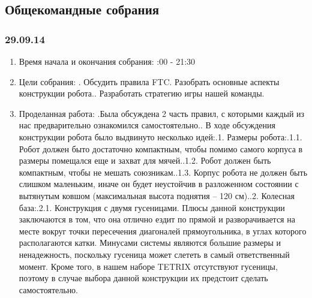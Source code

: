 \documentclass[12pt]{article}
\begin{document}
	      \subsection{Общекомандные собрания}
	      \subsubsection{29.09.14}
	      \begin{enumerate}
	      	\item Время начала и окончания собрания:
	      	:00 - 21:30
	      	\item Цели собрания:
	      	. Обсудить правила FTC. Разобрать основные аспекты конструкции робота.. Разработать стратегию игры нашей команды.\newline
	      	\item Проделанная работа:
	      	.Была обсуждена 2 часть правил, с которыми каждый из нас предварительно ознакомился самостоятельно..	 В ходе обсуждения конструкции робота было выдвинуто несколько идей:.1.	Размеры робота:.1.1.	Робот должен быто достаточно компактным, чтобы помимо самого корпуса в размеры помещался еще и захват для мячей..1.2.	Робот должен быть компактным, чтобы не мешать союзникам..1.3.	Корпус робота не должен быть слишком маленьким, иначе он будет неустойчив в разложенном состоянии с вытянутым ковшом (максимальная высота поднятия – 120 см)..2.	Колесная база:.2.1.	Конструкция с двумя гусеницами. Плюсы данной конструкции заключаются в том, что она отлично ездит по прямой  и разворачивается на месте вокруг точки пересечения диагоналей прямоугольника, в углах которого располагаются катки. Минусами системы являются большие размеры и ненадежность, поскольку гусеница может слететь в самый ответственный момент. Кроме того, в нашем наборе TETRIX отсутствуют гусеницы, поэтому в случае выбора данной конструкции их предстоит сделать самостоятельно.\newline

\end{enumerate}
\end{document}
